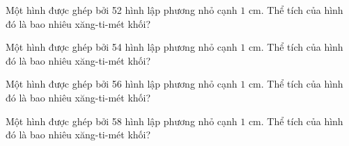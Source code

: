 \begin{ex}
  Một hình được ghép bởi 52 hình lập phương nhỏ cạnh $1\text{ cm}$. Thể tích của hình đó là bao nhiêu xăng-ti-mét khối?
\end{ex}

\begin{ex}
  Một hình được ghép bởi 54 hình lập phương nhỏ cạnh $1\text{ cm}$. Thể tích của hình đó là bao nhiêu xăng-ti-mét khối?
\end{ex}

\begin{ex}
  Một hình được ghép bởi 56 hình lập phương nhỏ cạnh $1\text{ cm}$. Thể tích của hình đó là bao nhiêu xăng-ti-mét khối?
\end{ex}

\begin{ex}
  Một hình được ghép bởi 58 hình lập phương nhỏ cạnh $1\text{ cm}$. Thể tích của hình đó là bao nhiêu xăng-ti-mét khối?
\end{ex}
